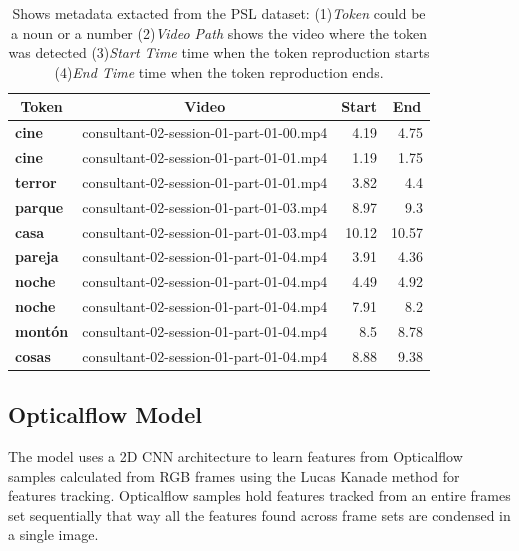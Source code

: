 \documentclass[twocolumn,conference]{article}
\begin{document}
\begin{table}[!htb]
\captionsetup{font=footnotesize}
\centering
\begin{tabular}{ l p{10em} r r }
\toprule
\multicolumn{1}{c}{\textbf{Token}} & 
	\multicolumn{1}{c}{\textbf{Video}} &
	\multicolumn{1}{c}{\textbf{Start}} &
	\multicolumn{1}{c}{\textbf{End}}\\
\midrule
\textbf{cine}&	consultant-02-session-01-part-01-00.mp4&	4.19&	4.75\\
\textbf{cine}&	consultant-02-session-01-part-01-01.mp4&	1.19&	1.75\\
\textbf{terror}&	consultant-02-session-01-part-01-01.mp4&	3.82&	4.4\\
\textbf{parque}&	consultant-02-session-01-part-01-03.mp4&	8.97&	9.3\\
\textbf{casa}&	consultant-02-session-01-part-01-03.mp4&	10.12&	10.57\\
\textbf{pareja}&	consultant-02-session-01-part-01-04.mp4&	3.91&	4.36\\
\textbf{noche}&	consultant-02-session-01-part-01-04.mp4&	4.49&	4.92\\
\textbf{noche}&	consultant-02-session-01-part-01-04.mp4&	7.91&	8.2\\
\textbf{mont\'on}&	consultant-02-session-01-part-01-04.mp4&	8.5&	8.78\\
\textbf{cosas}&	consultant-02-session-01-part-01-04.mp4&	8.88&	9.38\\
\bottomrule
\end{tabular}
\caption{Shows metadata extacted from the PSL dataset: (1)\textit{Token} could be a noun or a number (2)\textit{Video Path} shows the video where the token was detected (3)\textit{Start Time} time when the token reproduction starts (4)\textit{End Time} time when the token reproduction ends.}
\label{tab:token-video-mapping}
\end{table}

\subsection{Opticalflow Model}\label{opticalflowmodel}
The model uses a 2D CNN architecture to learn features from Opticalflow samples calculated from RGB frames using the Lucas Kanade method for features tracking. Opticalflow samples hold features tracked from an entire frames set sequentially that way all the features found across frame sets are condensed in a single image.
\end{document}
